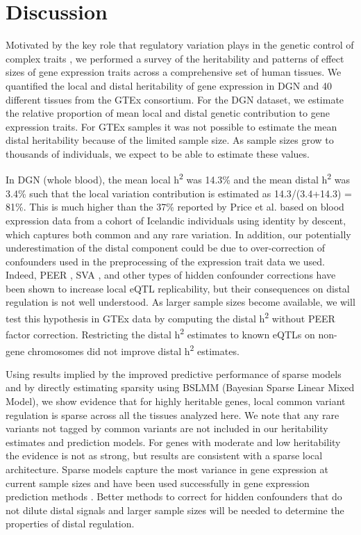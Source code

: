 \documentclass[10pt,letterpaper]{article}
\begin{document}
\section*{Discussion}
Motivated by the key role that regulatory variation plays in the genetic control of complex traits \cite{Nicolae_2010,Nica_2010,Gusev_2014}, we performed a survey of the heritability and patterns of effect sizes of gene expression traits across a comprehensive set of human tissues. We quantified the local and distal heritability of gene expression in DGN and 40 different tissues from the GTEx consortium. For the DGN dataset, we estimate the relative proportion of mean local and distal genetic contribution to gene expression traits. For GTEx samples it was not possible to estimate the mean distal heritability because of the limited sample size. As sample sizes grow to thousands of individuals, we expect to be able to estimate these values.

In DGN (whole blood), the mean local h\textsuperscript{2} was 14.3\% and the mean distal h\textsuperscript{2} was 3.4\% such that the local variation contribution is estimated as 14.3/(3.4+14.3) = 81\%. This is much higher than the 37\% reported by Price et al. \cite{Price_2011} based on blood expression data from a cohort of Icelandic individuals using identity by descent, which captures both common and any rare variation. In addition, our potentially underestimation of the distal component could be due to over-correction of confounders used in the preprocessing of the expression trait data we used. Indeed, PEER \cite{Stegle_2012}, SVA \cite{Leek_2007}, and other types of hidden confounder corrections have been shown to increase local eQTL replicability, but their consequences on distal regulation is not well understood.  As larger sample sizes become available, we will test this hypothesis in GTEx data by computing the distal h\textsuperscript{2} without PEER factor correction. Restricting the distal h\textsuperscript{2} estimates to known eQTLs  on non-gene chromosomes did not improve distal h\textsuperscript{2} estimates.

Using results implied by the improved predictive performance of sparse models and by directly estimating sparsity using BSLMM (Bayesian Sparse Linear Mixed Model), we show evidence that for highly heritable genes, local common variant regulation is sparse across all the tissues analyzed here. We note that any rare variants not tagged by common variants are not included in our heritability estimates and prediction models. For genes with moderate and low heritability the evidence is not as strong, but results are consistent with a sparse local architecture. Sparse models capture the most variance in gene expression at current sample sizes and have been used successfully in gene expression prediction methods \cite{manor2013robust,Gamazon_2015,gusev2016integrative,zhu2016integration}. Better methods to correct for hidden confounders that do not dilute distal signals and larger sample sizes will be needed to determine the properties of distal regulation. 
\end{document}

